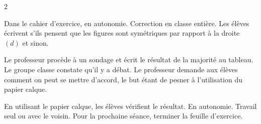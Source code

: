 \documentclass[../main.tex]{subfiles}
\begin{document}
    \begin{multicols}{2}
        \begin{seance}
            \competences{
                \item
            }
            \prerequis{
                \item
            }
                Dans le cahier d'exercice, en autonomie.
                Correction en classe entière.
                Les élèves écrivent   s'ils pensent que les figures
                sont symétriques par rapport à la droite $(d)$ et  sinon.
                
                Le professeur procède à un sondage et écrit le résultat de la
                majorité au tableau. Le groupe classe constate qu'il y a débat.
                Le professeur demande aux élèves comment on peut se mettre d'accord,
                le but étant de pesner à l'utilisation du papier calque.
            
                En utilisant le papier calque, les élèves vérifient le résultat.
                En autonomie. Travail seul ou avec le voisin.
            \agenda Pour la prochaine séance, terminer la feuille d'exercice.
        \end{seance}
        \begin{seance}
            \competences{
                \item
            }
            \prerequis{
                \item
            }
            \phase{}
        \end{seance}
        \begin{seance}
            \competences{
                \item
            }
            \prerequis{
                \item
            }
            \phase{}
        \end{seance}
        \begin{seance}
            \competences{
                \item
            }
            \prerequis{
                \item
            }
            
        \end{seance}
        \begin{seance}
            \competences{
                \item
            }
            \prerequis{
                \item
            }
            \phase{}
        \end{seance}
    \end{multicols}
\end{document}
